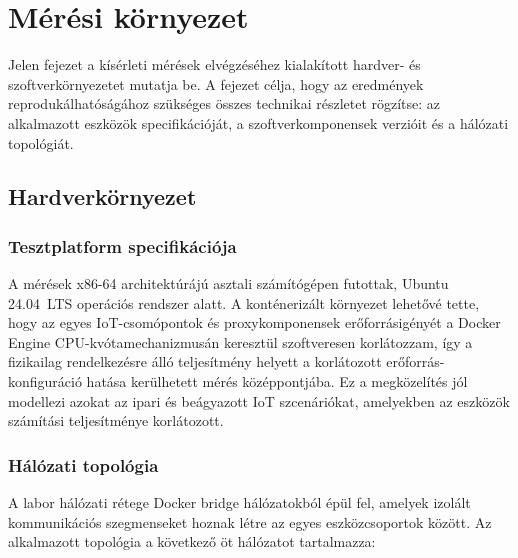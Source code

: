 \chapter{Mérési környezet}

Jelen fejezet a kísérleti mérések elvégzéséhez kialakított hardver- és szoftverkörnyezetet mutatja be.
A fejezet célja, hogy az eredmények reprodukálhatóságához szükséges összes technikai részletet
rögzítse: az alkalmazott eszközök specifikációját, a szoftverkomponensek verzióit és a hálózati
topológiát.

\section{Hardverkörnyezet}

\subsection{Tesztplatform specifikációja}

A mérések x86-64 architektúrájú asztali számítógépen futottak, Ubuntu 24.04~LTS operációs
rendszer alatt. A konténerizált környezet lehetővé tette, hogy az egyes IoT-csomópontok és
proxykomponensek erőforrásigényét a Docker Engine CPU-kvótamechanizmusán keresztül
szoftveresen korlátozzam, így a fizikailag rendelkezésre álló teljesítmény helyett a korlátozott
erőforrás-konfiguráció hatása kerülhetett mérés középpontjába. Ez a megközelítés jól modellezi
azokat az ipari és beágyazott IoT szcenáriókat, amelyekben az eszközök számítási teljesítménye
korlátozott.

\subsection{Hálózati topológia}

A labor hálózati rétege Docker bridge hálózatokból épül fel, amelyek izolált kommunikációs
szegmenseket hoznak létre az egyes eszközcsoportok között. Az alkalmazott topológia a következő
öt hálózatot tartalmazza:

